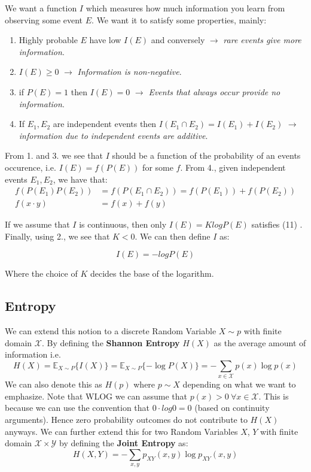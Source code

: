 \documentclass[]{article}
\theoremstyle{mattstyle}
\theoremstyle{definition}
\begin{document}
We want a function $I$ which measures how much information you learn from observing some event $E$. We want it to satisfy some properties, mainly:

\begin{enumerate}
	\item Highly probable $E$ have low $I(E)$ and conversely $\rightarrow$ \emph{ rare events give more information}.
	\item $I(E) \ge 0$ $\rightarrow$\emph{ Information is non-negative}.
	\item if $P(E)=1$ then $I(E) = 0$ $\rightarrow$\emph{ Events that always occur provide no information}.
	\item If $E_1, E_2$ are independent events then $I(E_1 \cap E_2) = I(E_1) + I(E_2)$ $\rightarrow$\emph{ information due to independent events are additive}.
\end{enumerate}
From 1. and 3. we see that $I$ should be a function of the probability of an events occurence, i.e. $I(E)=f(P(E))$ for some $f$. From 4., given independent events $E_1, E_2$, we have that:
\begin{align}
f(P(E_1)P(E_2)) &= f(P(E_1\cap E_2)) = f(P(E_1)) + f(P(E_2))\\
f(x\cdot y) &= f(x) + f(y)
\end{align}

If we assume that $I$ is continuous, then only $I(E) = Klog P(E)$ satisfies (11)  \cite{EntNotes}. Finally, using 2., we see that $K<0$. We can then define $I$ as:

\begin{equation}
I(E) = -log P(E)
\end{equation}

Where the choice of $K$ decides the base of the logarithm.

\subsection{Entropy}
We can extend this notion to a discrete Random Variable $X\sim p$ with finite domain $\mathcal{X}$. By defining the \textbf{Shannon Entropy} $H(X)$ as the average amount of information i.e. 
\begin{equation}
H(X) = \mathbb{E}_{X\sim P}\{I(X)\} = \mathbb{E}_{X\sim P}\{-\log P(X)\} = -\sum_{x\in\mathcal{X}}p(x)\log p(x)
\end{equation}
We can also denote this as $H(p)$ where $p \sim X$ depending on what we want to emphasize. Note that WLOG we can assume that \(p(x)>0 \ \forall x\in\mathcal{X}\). This is because we can use the convention that \(0\cdot log0 = 0\) (based on continuity arguments). Hence zero probability outcomes do not contribute to $H(X)$ anyways. We can further extend this for two Random Variables $X$, $Y$ with finite domain \(\mathcal{X}\times\mathcal{Y}\) by defining the \textbf{Joint Entropy} as:
\begin{equation}
H(X,Y) = -\sum_{x,y}p_{XY}(x,y)\log p_{XY}(x,y)
\end{equation}
\end{document}

